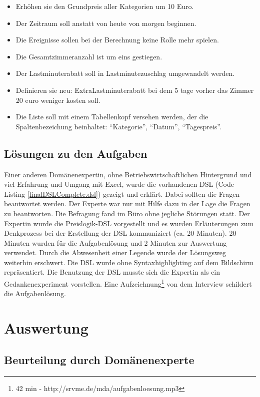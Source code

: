 \documentclass[11pt,english,ngerman, headsepline]{scrreprt}
\begin{document}
\begin{itemize} 
\item Erhöhen sie den Grundpreis aller Kategorien um 10 Euro. 
\item Der Zeitraum soll anstatt von heute von morgen beginnen.
\item Die Ereignisse sollen bei der Berechnung keine Rolle mehr spielen.
\item Die Gesamtzimmeranzahl ist um eins gestiegen.
\item Der Lastminuterabatt soll in Lastminutezuschlag umgewandelt werden.
\item Definieren sie neu: ExtraLastminuterabatt bei dem 5 tage vorher
das Zimmer 20 euro weniger kosten soll. 
\item Die Liste soll mit einem Tabellenkopf versehen werden, der die
Spaltenbezeichung beinhaltet: ``Kategorie'', ``Datum'', ``Tagespreis''. 
\end{itemize}

\section{Lösungen zu den Aufgaben}

Einer anderen Domänenexpertin, ohne Betriebswirtschaftlichen Hintergrund und
viel Erfahrung und Umgang mit Excel, wurde die vorhandenen DSL (Code Listing
\ref{finalDSLComplete.dsl}) gezeigt und erklärt.
Dabei sollten die Fragen beantwortet werden. Der Experte war nur mit Hilfe dazu
in der Lage die Fragen zu beantworten.
Die Befragung fand im Büro ohne jegliche Störungen statt. Der Expertin wurde die
Preislogik-DSL vorgestellt und es wurden Erläuterungen zum Denkprozess bei der
Erstellung der DSL kommuniziert (ca. 20 Minuten). 20 Minuten wurden für die
Aufgabenlösung und 2 Minuten zur Auswertung verwendet. Durch die Abwesenheit
einer Legende wurde der Lösungsweg weiterhin erschwert. Die DSL wurde ohne
Syntaxhighlighting auf dem Bildschirm repräsentiert. Die Benutzung
der DSL musste sich die Expertin als ein Gedankenexperiment
vorstellen.
Eine Aufzeichnung\footnote{42 min - http://srvme.de/mda/aufgabenloesung.mp3} von dem Interview schildert die Aufgabenlösung.


  
\chapter{Auswertung}
  

\section{Beurteilung durch Domänenexperte}
\end{document}
